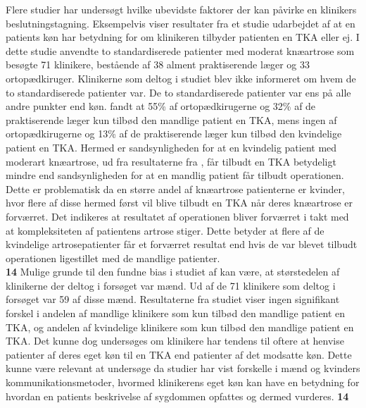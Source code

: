 Flere studier har undersøgt hvilke ubevidste faktorer der kan påvirke en klinikers beslutningstagning. Eksempelvis viser resultater fra et studie udarbejdet af \cite{borkhoff2008} at en patients køn har betydning for om klinikeren tilbyder patienten en TKA eller ej. I dette studie anvendte \cite{borkhoff2008} to standardiserede patienter med moderat knæartrose som besøgte 71 klinikere, bestående af 38 alment praktiserende læger og 33 ortopædkiruger. Klinikerne som deltog i studiet blev ikke informeret om hvem de to standardiserede patienter var. De to standardiserede patienter var ens på alle andre punkter end køn. \cite{borkhoff2008} fandt at 55\% af ortopædkirugerne og 32\% af de praktiserende læger kun tilbød den mandlige patient en TKA, mens ingen af ortopædkirugerne og 13\% af de praktiserende læger kun tilbød den kvindelige patient en TKA. Hermed er sandsynligheden for at en kvindelig patient med moderart knæartrose, ud fra resultaterne fra \cite{borkhoff2008}, får tilbudt en TKA betydeligt mindre end sandsynligheden for at en mandlig patient får tilbudt operationen. Dette er problematisk da en større andel af knæartrose patienterne er kvinder, hvor flere af disse hermed først vil blive tilbudt en TKA når deres knæartrose er forværret. Det indikeres at resultatet af operationen bliver forværret i takt med at kompleksiteten af patientens artrose stiger. \citep{fortin1999} Dette betyder at flere af de kvindelige artrosepatienter får et forværret resultat end hvis de var blevet tilbudt operationen ligestillet med de mandlige patienter. \citep{borkhoff2008} \\
\textbf{14} Mulige grunde til den fundne bias i studiet af \cite{borkhoff2008} kan være, at størstedelen af klinikerne der deltog i forsøget var mænd. Ud af de 71 klinikere som deltog i forsøget var 59 af disse mænd. Resultaterne fra studiet viser ingen signifikant forskel i andelen af mandlige klinikere som kun tilbød den mandlige patient en TKA, og andelen af kvindelige klinikere som kun tilbød den mandlige patient en TKA. Det kunne dog undersøges om klinikere har tendens til oftere at henvise patienter af deres eget køn til en TKA end patienter af det modsatte køn. Dette kunne være relevant at undersøge da studier har vist forskelle i mænd og kvinders kommunikationsmetoder, hvormed klinikerens eget køn kan have en betydning for hvordan en patients beskrivelse af sygdommen opfattes og dermed vurderes. \citep{street2002} \textbf{14}    

